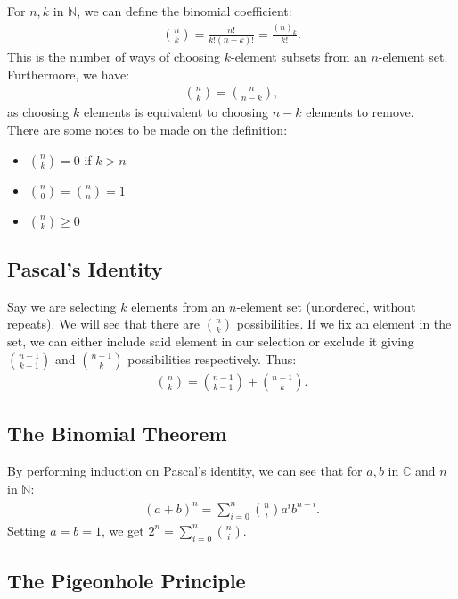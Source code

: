 \documentclass[a4paper, 12pt, twoside]{article}
\begin{document}
For $n, k$ in $\mathbb{N}$, we can define the binomial coefficient: \begin{gather*}
 {n \choose k} = \frac{n!}{k!(n-k)!} = \frac{(n)_k}{k!}.
\end{gather*} 
This is the number of ways of choosing $k$-element subsets
from an $n$-element set. Furthermore, we have: \begin{gather*}
  {n \choose k} = {n \choose n - k},
\end{gather*} as choosing $k$ elements is equivalent to choosing
$n - k$ elements to remove.
\\[\baselineskip]
There are some notes to be made on the definition: \begin{itemize}
  \item ${n \choose k} = 0$ if $k > n$
  \item ${n \choose 0} = {n \choose n} = 1$
  \item ${n \choose k} \geq 0$
\end{itemize}

\subsection{Pascal's Identity}

Say we are selecting $k$ elements from an $n$-element set (unordered, 
without repeats). We will see that there are ${n \choose k}$ possibilities.
If we fix an element in the set, we can either include said element in
our selection or exclude it giving ${n - 1 \choose k - 1}$ and 
${n - 1 \choose k}$ possibilities respectively. Thus: \begin{gather*}
  {n \choose k} = {n - 1 \choose k - 1} + {n - 1 \choose k}.
\end{gather*}

\subsection{The Binomial Theorem}

By performing induction on Pascal's identity, we can see that for 
$a, b$ in $\mathbb{C}$ and $n$ in $\mathbb{N}$: \begin{gather*}
  (a + b)^n = \sum_{i = 0}^n {n \choose i}a^ib^{n - i}.
\end{gather*} Setting $a = b = 1$, we get $2^n = \sum_{i = 0}^n 
{n \choose i}$.

\subsection{The Pigeonhole Principle}
\end{document}
